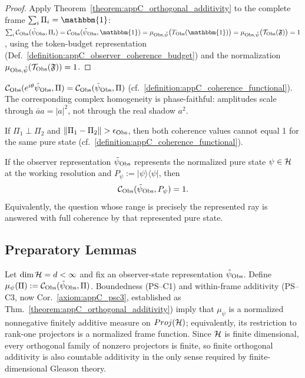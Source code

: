 \begin{proof}
\label{proof:appC_psc3}
Apply Theorem~\ref{theorem:appC_orthogonal_additivity} to the complete frame
$\sum_i \Pi_i = \mathbbm{1}$:
$\sum_i \mathcal{C}_{\Obs}(\tilde\psi_{\Obs}, \Pi_i)
= \mathcal{C}_{\Obs}(\tilde\psi_{\Obs}, \mathbbm{1})
= \mu_{\Obs,\tilde\psi}\big(T_\Obs(\mathbbm{1})\big)
= \mu_{\Obs,\tilde\psi}\big(\mathcal{T}_\Obs(\mathfrak{F})\big) = 1$,
using the token-budget representation
(Def.~\ref{definition:appC_observer_coherence_budget}) and the normalization
$\mu_{\mathrm{Obs},\tilde\psi}(\mathcal{T}_{\mathrm{Obs}}(\mathfrak{F})) = 1$.
\end{proof}

\begin{axiom}
\label{axiom:appC_psc4}
$\mathcal{C}_{\mathrm{Obs}}(e^{i\theta} \tilde\psi_{\mathrm{Obs}}, \Pi)
= \mathcal{C}_{\mathrm{Obs}}(\tilde\psi_{\mathrm{Obs}}, \Pi)$ \quad (cf.~\ref{definition:appC_coherence_functional}).
The corresponding complex homogeneity is phase-faithful: amplitudes scale through
$\overline a a=|a|^2$, not through the real shadow $a^2$.
\end{axiom}

\begin{axiom}
\label{axiom:appC_psc5}
If $\Pi_1 \perp \Pi_2$ and $\| \Pi_1 - \Pi_2 \| > \epsilon_{\mathrm{Obs}}$,
then both coherence values cannot equal 1 for the same pure state (cf.~\ref{definition:appC_coherence_functional}).
\end{axiom}

\begin{axiom}
\label{axiom:appC_psc6}
If the observer representation $\tilde\psi_{\mathrm{Obs}}$ represents the normalized pure
state $\psi\in\mathcal{H}$ at the working resolution and
$P_\psi:=|\psi\rangle\langle\psi|$, then
\[
\mathcal{C}_{\mathrm{Obs}}(\tilde\psi_{\mathrm{Obs}},P_\psi)=1.
\]
Equivalently, the question whose range is precisely the represented ray is
answered with full coherence by that represented pure state.
\end{axiom}

\subsection{Preparatory Lemmas}
\label{subsec:appC_born_lemmas}

\begin{lemma}
\label{lemma:appC_sigma_additivity}
Let $\dim\mathcal{H}=d<\infty$ and fix an observer-state representation
$\tilde\psi_{\mathrm{Obs}}$. Define
$\mu_\psi(\Pi):=\mathcal{C}_{\mathrm{Obs}}(\tilde\psi_{\mathrm{Obs}},\Pi)$.
Boundedness (PS--C1) and within-frame additivity (PS--C3, now
Cor.~\ref{axiom:appC_psc3}, established as
Thm.~\ref{theorem:appC_orthogonal_additivity}) imply that $\mu_\psi$ is a
normalized nonnegative finitely additive measure on $Proj(\mathcal{H})$; equivalently, its restriction to
rank-one projectors is a normalized frame function. Since $\mathcal{H}$ is finite
dimensional, every orthogonal family of nonzero projectors is finite, so finite
orthogonal additivity is also countable additivity in the only sense required by
finite-dimensional Gleason theory.
\end{lemma}

